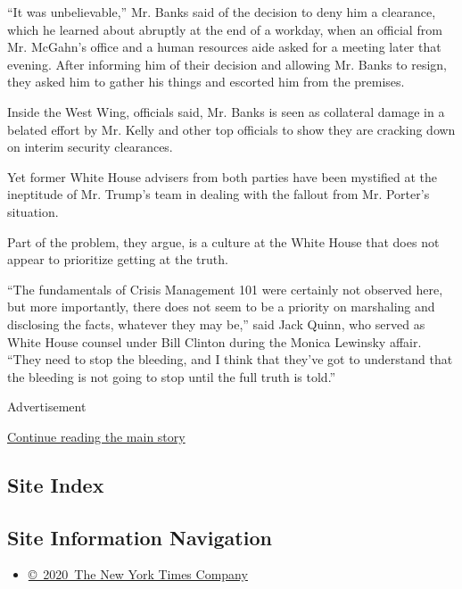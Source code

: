 ``It was unbelievable,'' Mr. Banks said of the decision to deny him a
clearance, which he learned about abruptly at the end of a workday, when
an official from Mr. McGahn's office and a human resources aide asked
for a meeting later that evening. After informing him of their decision
and allowing Mr. Banks to resign, they asked him to gather his things
and escorted him from the premises.

Inside the West Wing, officials said, Mr. Banks is seen as collateral
damage in a belated effort by Mr. Kelly and other top officials to show
they are cracking down on interim security clearances.

Yet former White House advisers from both parties have been mystified at
the ineptitude of Mr. Trump's team in dealing with the fallout from Mr.
Porter's situation.

Part of the problem, they argue, is a culture at the White House that
does not appear to prioritize getting at the truth.

``The fundamentals of Crisis Management 101 were certainly not observed
here, but more importantly, there does not seem to be a priority on
marshaling and disclosing the facts, whatever they may be,'' said Jack
Quinn, who served as White House counsel under Bill Clinton during the
Monica Lewinsky affair. ``They need to stop the bleeding, and I think
that they've got to understand that the bleeding is not going to stop
until the full truth is told.''

Advertisement

\protect\hyperlink{after-bottom}{Continue reading the main story}

\hypertarget{site-index}{%
\subsection{Site Index}\label{site-index}}

\hypertarget{site-information-navigation}{%
\subsection{Site Information
Navigation}\label{site-information-navigation}}

\begin{itemize}
\tightlist
\item
  \href{https://help.nytimes3xbfgragh.onion/hc/en-us/articles/115014792127-Copyright-notice}{©~2020~The
  New York Times Company}
\end{itemize}


